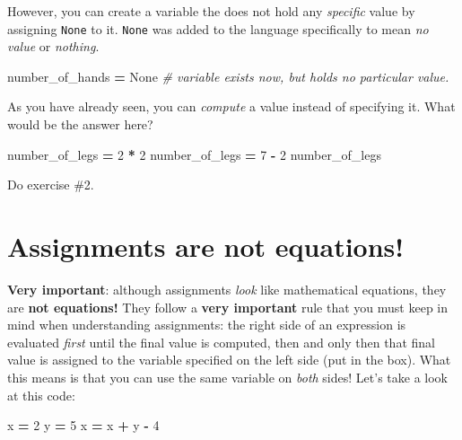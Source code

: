 \documentclass[
]{book}
\newenvironment{Shaded}{\begin{snugshade}}{\end{snugshade}}
\newcommand{\CommentTok}[1]{\textcolor[rgb]{0.56,0.35,0.01}{\textit{#1}}}
\newcommand{\DecValTok}[1]{\textcolor[rgb]{0.00,0.00,0.81}{#1}}
\newcommand{\NormalTok}[1]{#1}
\newcommand{\OperatorTok}[1]{\textcolor[rgb]{0.81,0.36,0.00}{\textbf{#1}}}
\newcommand{\VariableTok}[1]{\textcolor[rgb]{0.00,0.00,0.00}{#1}}
\begin{document}
However, you can create a variable the does not hold any \emph{specific} value by assigning \texttt{None} to it. \texttt{None} was added to the language specifically to mean \emph{no value} or \emph{nothing}.

\begin{Shaded}
\begin{Highlighting}[]
\NormalTok{number\_of\_hands }\OperatorTok{=} \VariableTok{None} \CommentTok{\# variable exists now, but holds no particular value.}
\end{Highlighting}
\end{Shaded}

As you have already seen, you can \emph{compute} a value instead of specifying it. What would be the answer here?

\begin{Shaded}
\begin{Highlighting}[]
\NormalTok{number\_of\_legs }\OperatorTok{=} \DecValTok{2} \OperatorTok{*} \DecValTok{2}
\NormalTok{number\_of\_legs }\OperatorTok{=} \DecValTok{7} \OperatorTok{{-}} \DecValTok{2}
\NormalTok{number\_of\_legs}
\end{Highlighting}
\end{Shaded}

Do exercise \#2.

\hypertarget{assignments-are-not-equations}{%
\section{Assignments are not equations!}\label{assignments-are-not-equations}}

\textbf{Very important}: although assignments \emph{look} like mathematical equations, they are \textbf{not equations!} They follow a \textbf{very important} rule that you must keep in mind when understanding assignments: the right side of an expression is evaluated \emph{first} until the final value is computed, then and only then that final value is assigned to the variable specified on the left side (put in the box). What this means is that you can use the same variable on \emph{both} sides! Let's take a look at this code:

\begin{Shaded}
\begin{Highlighting}[]
\NormalTok{x }\OperatorTok{=} \DecValTok{2}
\NormalTok{y }\OperatorTok{=} \DecValTok{5}
\NormalTok{x }\OperatorTok{=}\NormalTok{ x }\OperatorTok{+}\NormalTok{ y }\OperatorTok{{-}} \DecValTok{4}
\end{Highlighting}
\end{Shaded}
\end{document}
